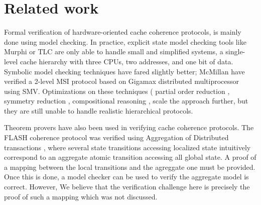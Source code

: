 \section{Related work}
\label{relatedWork}

Formal verification of hardware-oriented cache coherence protocols, is mainly
done using model checking. In practice, explicit state model checking tools like
Murphi \cite{murphi} or TLC \cite{tlc} are only able to handle small and
simplified systems, \eg{} a single-level cache hierarchy with three CPUs, two
addresses, and one bit of data. Symbolic model checking techniques have fared
slightly better; McMillan \etal{} have verified a 2-level MSI protocol based on
Gigamax distributed multiprocessor using SMV.  Optimizations on these techniques
(\eg{} partial order reduction \cite{part}, symmetry reduction \cite{sym1,
  sym2}, compositional reasoning \cite{somethink}, \etc{} scale the approach
further, but they are still unable to handle realistic hierarchical protocols.

Theorem provers have also been used in verifying cache coherence protocols. The
FLASH coherence protocol \cite{flash} was verified using Aggregation of
Distributed transactions \cite{park}, where several state transitions accessing
localized state intuitively correspond to an aggregate atomic transition
accessing all global state. A proof of a mapping between the local transitions
and the agreggate one must be provided. Once this is done, a model checker can
be used to verify the aggregate model is correct. However, We believe that the
verification challenge here is precisely the proof of such a mapping which was
not discussed.


